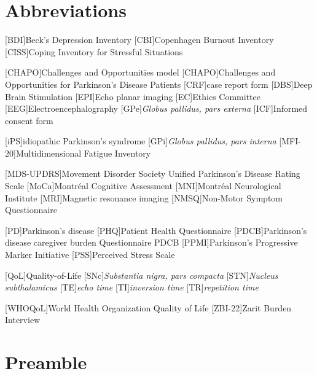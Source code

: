 \documentclass[
	a4paper, 
	11.5pt,
	headings=small, 
	twoside, 
	titlepage=firstiscover, 
 	pagesize=auto,
  	version=last,
	open=any,
	BCOR=14mm,
  	chapterprefix=false]{scrbook}
\begin{document}


\chapter*{Abbreviations}
\thispagestyle{plain}
\begin{multicols}{2}
\begin{acronym}
[BDI]{Beck's Depression Inventory}
[CBI]{Copenhagen Burnout Inventory}
[CISS]{Coping Inventory for Stressful Situations}

[CHAPO]{Challenges and Opportunities model}
[CHAPO]{Challenges and Opportunities for Parkinson's Disease Patients}
[CRF]{case report form}
[DBS]{Deep Brain Stimulation}
[EPI]{Echo planar imaging}
[EC]{Ethics Committee}
[EEG]{Electroencephalography}
[GPe]{\textit{Globus pallidus, pars externa}}
[ICF]{Informed consent form}

[iPS]{idiopathic Parkinson's syndrome}
[GPi]{\textit{Globus pallidus, pars interna}}
[MFI-20]{Multidimensional Fatigue Inventory}

[MDS-UPDRS]{Movement Disorder Society Unified Parkinson's Disease Rating Scale}
[MoCa]{Montréal Cognitive Assessment}
[MNI]{Montréal Neurological Institute}
[MRI]{Magnetic resonance imaging}
[NMSQ]{Non-Motor Symptom Questionnaire}

[PD]{Parkinson's disease}
[PHQ]{Patient Health Questionnaire}
[PDCB]{Parkinson’s disease caregiver burden Questionnaire PDCB}
[PPMI]{Parkinson's Progressive Marker Initiative}
[PSS]{Perceived Stress Scale}

[QoL]{Quality-of-Life}
[SNc]{\textit{Substantia nigra, pars compacta}}
[STN]{\textit{Nucleus subthalamicus}}
[TE]{\textit{echo time}}
[TI]{\textit{inversion time}}
[TR]{\textit{repetition time}}

[WHOQoL]{World Health Organization Quality of Life}
[ZBI-22]{Zarit Burden Interview}
\end{acronym}
\end{multicols}

\chapter{Preamble}
\end{document}
